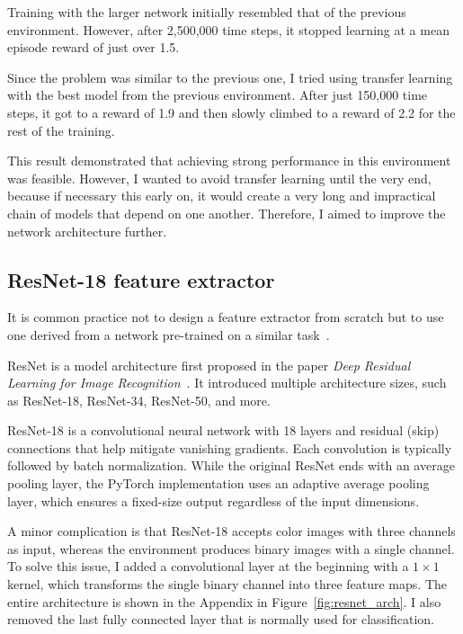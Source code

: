 \documentclass[
  digital,     %
  oneside,     %
  nosansbold,  %
  nocolorbold, %
  lof,         %
  lot,         %
]{fithesis4}
\begin{document}
Training with the larger network initially resembled that of the previous environment. However, after 2,500,000 time steps, it stopped learning at a mean episode reward of just over 1.5.

Since the problem was similar to the previous one, I tried using transfer learning with the best model from the previous environment. After just 150,000 time steps, it got to a reward of 1.9 and then slowly climbed to a reward of 2.2 for the rest of the training.

This result demonstrated that achieving strong performance in this environment was feasible. However, I wanted to avoid transfer learning until the very end, because if necessary this early on, it would create a very long and impractical chain of models that depend on one another. Therefore, I aimed to improve the network architecture further.

\subsection{ResNet-18 feature extractor}
\label{subsec:resnet}

It is common practice not to design a feature extractor from scratch but to use one derived from a network pre-trained on a similar task~\cite{DLforVisualSystems}.

ResNet is a model architecture first proposed in the paper \textit{Deep Residual Learning for Image Recognition}~\cite{ResNet18}. It introduced multiple architecture sizes, such as ResNet-18, ResNet-34, ResNet-50, and more.

ResNet-18 is a convolutional neural network with 18 layers and residual (skip) connections that help mitigate vanishing gradients. Each convolution is typically followed by batch normalization. While the original ResNet ends with an average pooling layer, the PyTorch implementation uses an adaptive average pooling layer, which ensures a fixed-size output regardless of the input dimensions.

A minor complication is that ResNet-18 accepts color images with three channels as input, whereas the environment produces binary images with a single channel. To solve this issue, I added a convolutional layer at the beginning with a $1\times1$ kernel, which transforms the single binary channel into three feature maps. The entire architecture is shown in the Appendix in Figure~\ref{fig:resnet_arch}. I also removed the last fully connected layer that is normally used for classification.
\end{document}
